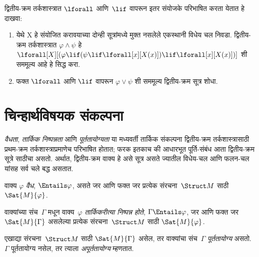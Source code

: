 \begin{prob}
  द्वितीय-क्रम
  तर्कशास्त्रात
  $\lforall$
  आणि~$\lif$
  वापरून इतर
  संयोजके
  परिभाषित
  करता येतात
  हे दाखवा:
  \begin{enumerate}
    \item येथे X हे संयोजित करावयाच्या दोन्ही सूत्रांमध्ये मुक्त नसलेले
    एकस्थानी विधेय चल निवडा. द्वितीय-क्रम तर्कशास्त्रात $\varphi \land \psi$ हे
    $\lforall[X][(\varphi \lif (\psi \lif \lforall[x][X(x)])\lif
    \lforall[x][X(x)])]$ शी सममूल्य आहे हे सिद्ध करा.
    \item फक्त $\lforall$ आणि $\lif$ वापरून
    $\varphi \lor \psi$ शी सममूल्य द्वितीय-क्रम सूत्र शोधा.
  \end{enumerate}
\end{prob}











\section{चिन्हार्थविषयक संकल्पना}\label{sol:syn:sem:sec}

\begin{explain}
\emph{वैधता},
\emph{तार्किक निष्पन्नता}
आणि
\emph{पूर्ततायोग्यता}
या मध्यवर्ती
तार्किक संकल्पना
द्वितीय-क्रम
तर्कशास्त्रासाठी
प्रथम-क्रम
तर्कशास्त्राप्रमाणेच
परिभाषित होतात;
फरक इतकाच की
आधारभूत पूर्ति-संबंध
आता द्वितीय-क्रम
सूत्रे
साठीचा असतो.
अर्थात, द्वितीय-क्रम
वाक्य
हे असे
सूत्र
असते ज्यातील
विधेय-चल आणि
फलन-चल यांसह
सर्व चले
बद्ध असतात.
\end{explain}

\begin{defn}[वैधता]
वाक्य $\varphi$
\emph{वैध},
$\Entails \varphi$,
असते जर आणि
फक्त जर प्रत्येक
संरचना~$\Struct M$
साठी $\Sat{M}{\varphi}$.
\end{defn}

\begin{defn}[तार्किक निष्पन्नता]
वाक्यांच्या
संच~$\Gamma$
मधून वाक्य~$\varphi$
\emph{तार्किकरीत्या
निष्पन्न होते},
$\Gamma
\Entails \varphi$,
जर आणि फक्त जर
$\Sat{M}{\Gamma}$
असलेल्या प्रत्येक
संरचना~$\Struct M$
साठी
$\Sat{M}{\varphi}$.
\end{defn}

\begin{defn}[पूर्ततायोग्यता]
एखाद्या
संरचना~$\Struct M$
साठी
$\Sat{M}{\Gamma}$
असेल, तर वाक्यांचा
संच~$\Gamma$
\emph{पूर्ततायोग्य}
असतो.
$\Gamma$
पूर्ततायोग्य नसेल,
तर त्याला
\emph{अपूर्ततायोग्य}
म्हणतात.
\end{defn}











